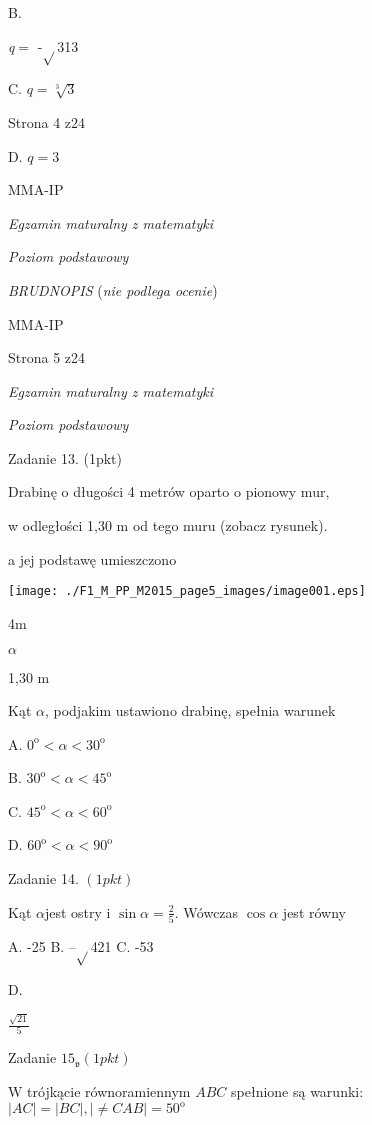 \documentclass[a4paper,12pt]{article}
\begin{document}
B.

{\it q}$=$ -$\sqrt{}$313

C. $q=\sqrt[3]{3}$

Strona 4 $\mathrm{z}24$

D. $q=3$

MMA-IP





{\it Egzamin maturalny z matematyki}

{\it Poziom podstawowy}

{\it BRUDNOPIS} ({\it nie podlega ocenie})

MMA-IP

Strona 5 z24





{\it Egzamin maturalny z matematyki}

{\it Poziom podstawowy}

Zadanie 13. (1pkt)

Drabinę o długości 4 metrów oparto o pionowy mur,

w odległości 1,30 m od tego muru (zobacz rysunek).

a jej podstawę umieszczono
\begin{center}
\texttt{[image: ./F1\_M\_PP\_M2015\_page5\_images/image001.eps]}
\end{center}
4m

$\alpha$

1,30 $\mathrm{m}$

Kąt $\alpha$, podjakim ustawiono drabinę, spełnia warunek

A. $0^{\mathrm{o}}<\alpha<30^{\mathrm{o}}$

B. $30^{\mathrm{o}}<\alpha<45^{\mathrm{o}}$

C. $45^{\mathrm{o}}<\alpha<60^{\mathrm{o}}$

D. $60^{\mathrm{o}}<\alpha<90^{\mathrm{o}}$

Zadanie 14. $(1pkt)$

Kąt $\alpha$jest ostry i $\displaystyle \sin\alpha=\frac{2}{5}$. Wówczas $\cos\alpha$ jest równy

A. -25 B. --$\sqrt{}$421 C. -53

D.

$\displaystyle \frac{\sqrt{21}}{5}$

Zadanie $15_{\mathfrak{v}}(1pkt)$

$\mathrm{W}$ trójkącie równoramiennym $ABC$ spełnione są warunki: $|AC|=|BC|, |\neq CAB|=50^{\mathrm{o}}$
\end{document}
